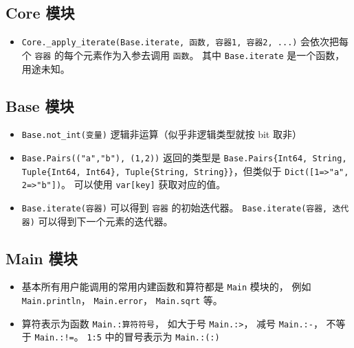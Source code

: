 \subsection{Core 模块}
\begin{itemize}
\item \verb`Core._apply_iterate(Base.iterate, 函数, 容器1, 容器2, ...)` 会依次把每个 \verb`容器` 的每个元素作为入参去调用 \verb`函数`。 其中 \verb`Base.iterate` 是一个函数，用途未知。
\end{itemize}

\subsection{Base 模块}
\begin{itemize}
\item \verb`Base.not_int(变量)` 逻辑非运算（似乎非逻辑类型就按 bit 取非）
\item \verb`Base.Pairs(("a","b"), (1,2))` 返回的类型是 \verb`Base.Pairs{Int64, String, Tuple{Int64, Int64}, Tuple{String, String}}`，但类似于 \verb`Dict([1=>"a", 2=>"b"])`。 可以使用 \verb`var[key]` 获取对应的值。
\item \verb`Base.iterate(容器)` 可以得到 \verb`容器` 的初始迭代器。 \verb`Base.iterate(容器, 迭代器)` 可以得到下一个元素的迭代器。
\end{itemize}

\subsection{Main 模块}

\begin{itemize}
\item 基本所有用户能调用的常用内建函数和算符都是 \verb`Main` 模块的， 例如 \verb`Main.println`， \verb`Main.error`， \verb`Main.sqrt` 等。
\item 算符表示为函数 \verb`Main.:算符符号`， 如大于号 \verb`Main.:>`， 减号 \verb`Main.:-`， 不等于 \verb`Main.:!=`。 \verb`1:5` 中的冒号表示为 \verb`Main.:(:)`
\end{itemize}

